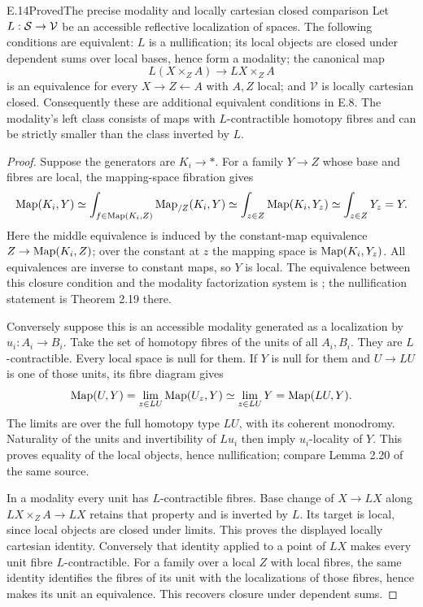 \begin{claim}{E.14}{Proved}{The precise modality and locally cartesian closed comparison}
Let $L:\mathcal S\to\mathcal V$ be an accessible reflective localization of spaces. The following conditions are equivalent: $L$ is a nullification; its local objects are closed under dependent sums over local bases, hence form a modality; the canonical map
\[
 L(X\times_Z A)\longrightarrow LX\times_Z A
\]
is an equivalence for every $X\to Z\leftarrow A$ with $A,Z$ local; and $\mathcal V$ is locally cartesian closed. Consequently these are additional equivalent conditions in E.8. The modality's left class consists of maps with $L$-contractible homotopy fibres and can be strictly smaller than the class inverted by $L$.
\end{claim}
\begin{proof}
Suppose the generators are $K_i\to *$. For a family $Y\to Z$ whose base and fibres are local, the mapping-space fibration gives
\[
 \mathrm{Map}(K_i,Y)\simeq
 \int_{f\in\mathrm{Map}(K_i,Z)}\mathrm{Map}_{/Z}(K_i,Y)
 \simeq\int_{z\in Z}\mathrm{Map}(K_i,Y_z)
 \simeq\int_{z\in Z}Y_z=Y.
\]
Here the middle equivalence is induced by the constant-map equivalence $Z\to\mathrm{Map}(K_i,Z)$; over the constant at $z$ the mapping space is $\mathrm{Map}(K_i,Y_z)$. All equivalences are inverse to constant maps, so $Y$ is local. The equivalence between this closure condition and the modality factorization system is \citet[Theorems 1.34 and 1.54]{EFRijkeShulmanSpitters2020}; the nullification statement is Theorem 2.19 there.

Conversely suppose this is an accessible modality generated as a localization by $u_i:A_i\to B_i$. Take the set of homotopy fibres of the units of all $A_i,B_i$. They are $L$-contractible. Every local space is null for them. If $Y$ is null for them and $U\to LU$ is one of those units, its fibre diagram gives
\[
 \mathrm{Map}(U,Y)=\lim_{z\in LU}\mathrm{Map}(U_z,Y)
 \simeq\lim_{z\in LU}Y=\mathrm{Map}(LU,Y).
\]
The limits are over the full homotopy type $LU$, with its coherent monodromy. Naturality of the units and invertibility of $Lu_i$ then imply $u_i$-locality of $Y$. This proves equality of the local objects, hence nullification; compare Lemma 2.20 of the same source.

In a modality every unit has $L$-contractible fibres. Base change of $X\to LX$ along $LX\times_ZA\to LX$ retains that property and is inverted by $L$. Its target is local, since local objects are closed under limits. This proves the displayed locally cartesian identity. Conversely that identity applied to a point of $LX$ makes every unit fibre $L$-contractible. For a family over a local $Z$ with local fibres, the same identity identifies the fibres of its unit with the localizations of those fibres, hence makes its unit an equivalence. This recovers closure under dependent sums.


\end{proof}
